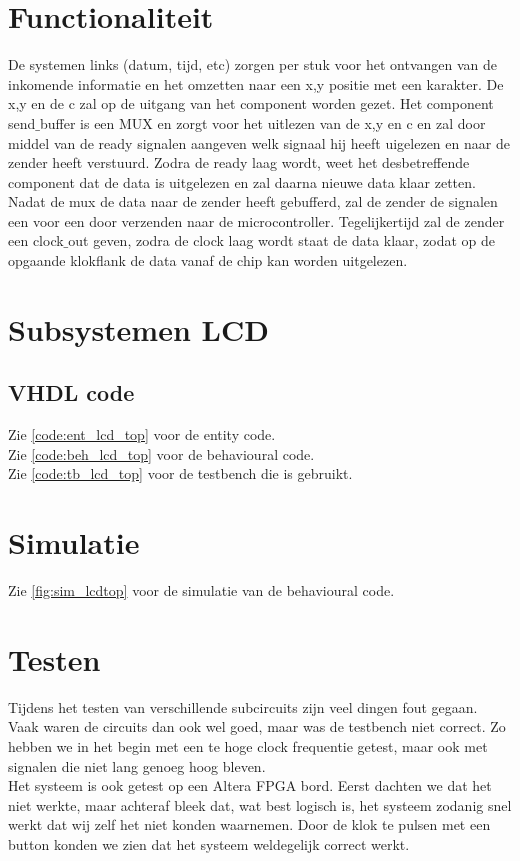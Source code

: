 \section{Functionaliteit}
De systemen links (datum, tijd, etc)  zorgen per stuk voor het ontvangen van de inkomende informatie en het omzetten naar een x,y positie met een karakter. De x,y en de c zal op de uitgang van het component worden gezet. 
Het component send$\_$buffer is een MUX en zorgt voor het uitlezen van de x,y en c en zal door middel van de ready signalen aangeven welk signaal hij heeft uigelezen en naar de zender heeft verstuurd. Zodra de ready laag wordt, weet het desbetreffende component dat de data is uitgelezen en zal daarna nieuwe data klaar zetten. 
Nadat de mux de data naar de zender heeft gebufferd, zal de zender de signalen een voor een door  verzenden naar de microcontroller. Tegelijkertijd zal de zender een clock$\_$out geven, zodra de clock laag wordt staat de data klaar, zodat op de opgaande klokflank de data vanaf de chip kan worden uitgelezen. 

\section{Subsystemen LCD}








\subsection{VHDL code}
Zie \ref{code:ent_lcd_top} voor de entity code. \\
Zie \ref{code:beh_lcd_top} voor de behavioural code.\\
Zie \ref{code:tb_lcd_top} voor de testbench die is gebruikt.

\section{Simulatie}
Zie \ref{fig:sim_lcdtop} voor de simulatie van de behavioural code. \\

\section{Testen}
Tijdens het testen van verschillende subcircuits zijn veel dingen fout gegaan. Vaak waren de circuits dan ook wel goed, maar was de testbench niet correct. Zo hebben we in het begin met een te hoge clock frequentie getest, maar ook met signalen die niet lang genoeg hoog bleven. \\
Het systeem is ook getest op een Altera FPGA bord. Eerst dachten we dat het niet werkte, maar achteraf bleek dat, wat best logisch is,  het systeem zodanig snel werkt dat wij zelf het niet konden waarnemen. Door de klok te pulsen met een button konden we zien dat het systeem weldegelijk correct werkt.

